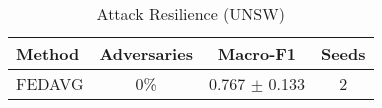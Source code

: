 \begin{table}[htbp]
\centering
\caption{Attack Resilience (UNSW)}\label{tab:attack_unsw}
\begin{tabular}{lccc}
\toprule
Method & Adversaries & Macro-F1 & Seeds \\
\midrule
FEDAVG & 0\% & 0.767 $\pm$ 0.133 & 2 \\
\bottomrule
\end{tabular}
\end{table}
